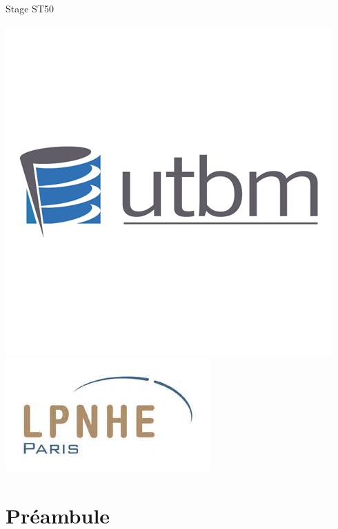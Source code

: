 \documentclass[french,a4paper,12pt]{report}
\begin{document}
\begin{titlepage}
    \vspace{1cm}
      {\large{	\@date\\
    \vspace{1cm}
       Stage ST50}}\\
    \vspace{1cm}
        {\large \@author} \\
    \vfill
        \includegraphics[height=0.13\textheight]{UTBM_LOGO.png}
        \hfill
        \includegraphics[height=0.09\textheight]{LPNHE_LOGO.png}
  \end{titlepage}
\makeatother

\tableofcontents
\parskip=5pt %


%
%
\part{Préambule}
\end{document}
